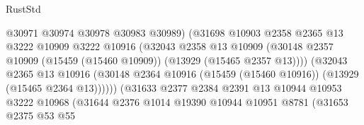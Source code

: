 \begin{lexlean}{RustStd}
\begin{coremodule}
                                          @30971
                                          @30974
                                          @30978
                                          @30983
                                          @30989)
                                        (@31698
                                          @10903
                                          @2358
                                          @2365
                                          @13
                                          @3222
                                          @10909
                                          @3222
                                          @10916
                                          (@32043
                                            @2358
                                            @13
                                            @10909
                                            (@30148
                                              @2357
                                              @10909
                                              (@15459 (@15460 @10909))
                                              (@13929 (@15465 @2357 @13))))
                                          (@32043
                                            @2365
                                            @13
                                            @10916
                                            (@30148
                                              @2364
                                              @10916
                                              (@15459 (@15460 @10916))
                                              (@13929 (@15465 @2364 @13))))))
                                      (@31633
                                        @2377
                                        @2384
                                        @2391
                                        @13
                                        @10944
                                        @10953
                                        @3222
                                        @10968
                                        (@31644
                                          @2376
                                          @1014
                                          @19390
                                          @10944
                                          @10951
                                          @8781
                                          (@31653
                                            @2375
                                            @53
                                            @55

\end{coremodule}
\end{lexlean}
